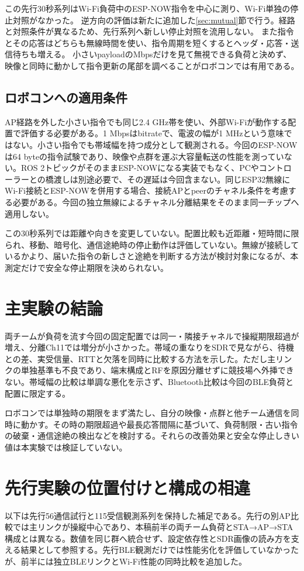 \documentclass[a4paper,10pt]{ltjsarticle}
\begin{document}
この先行30秒系列はWi-Fi負荷中のESP-NOW指令を中心に測り、Wi-Fi単独の停止対照がなかった。
逆方向の評価は新たに追加した\ref{sec:mutual}節で行う。経路と対照条件が異なるため、先行系列へ新しい停止対照を流用しない。
また指令とその応答はどちらも無線時間を使い、指令周期を短くするとヘッダ・応答・送信待ちも増える。
小さいpayloadのMbpsだけを見て無視できる負荷と決めず、映像と同時に動かして指令更新の尾部を調べることがロボコンでは有用である。

\subsection{ロボコンへの適用条件}
AP経路を外した小さい指令でも同じ2.4 GHz帯を使い、外部Wi-Fiが動作する配置で評価する必要がある。1 Mbpsはbitrateで、電波の幅が1 MHzという意味ではない。小さい指令でも帯域幅を持つ成分として観測される。今回のESP-NOWは64 byteの指令試験であり、映像や点群を運ぶ大容量転送の性能を測っていない。ROS 2トピックがそのままESP-NOWになる実装でもなく、PCやコントローラーとの橋渡しは別途必要で、その遅延は今回含まない。同じESP32無線にWi-Fi接続とESP-NOWを併用する場合、接続APとpeerのチャネル条件を考慮する必要がある\cite{espnowGuide}。今回の独立無線によるチャネル分離結果をそのまま同一チップへ適用しない。

この30秒系列では距離や向きを変更していない。配置比較も近距離・短時間に限られ、移動、暗号化、通信途絶時の停止動作は評価していない。無線が接続しているかより、届いた指令の新しさと途絶を判断する方法が検討対象になるが、本測定だけで安全な停止期限を決められない。
\section{主実験の結論}
両チームが負荷を流す今回の固定配置では同一・隣接チャネルで操縦期限超過が増え、分離Ch11では増分が小さかった。帯域の重なりをSDRで見ながら、待機との差、実受信量、RTTと欠落を同時に比較する方法を示した。ただし主リンクの単独基準も不良であり、端末構成とRFを原因分離せずに競技場へ外挿できない。帯域幅の比較は単調な悪化を示さず、Bluetooth比較は今回のBLE負荷と配置に限定する。

ロボコンでは単独時の期限をまず満たし、自分の映像・点群と他チーム通信を同時に動かす。その時の期限超過や最長応答間隔に基づいて、負荷制限・古い指令の破棄・通信途絶の検出などを検討する。それらの改善効果と安全な停止しきい値は本実験では検証していない。

\clearpage
\section{先行実験の位置付けと構成の相違}
以下は先行56通信試行と115受信観測系列を保持した補足である。先行の別AP比較では主リンクが操縦中心であり、本稿前半の両チーム負荷とSTA→AP→STA構成とは異なる。数値を同じ群へ統合せず、設定依存性とSDR画像の読み方を支える結果として参照する。先行BLE観測だけでは性能劣化を評価していなかったが、前半には独立BLEリンクとWi-Fi性能の同時比較を追加した。
\end{document}
